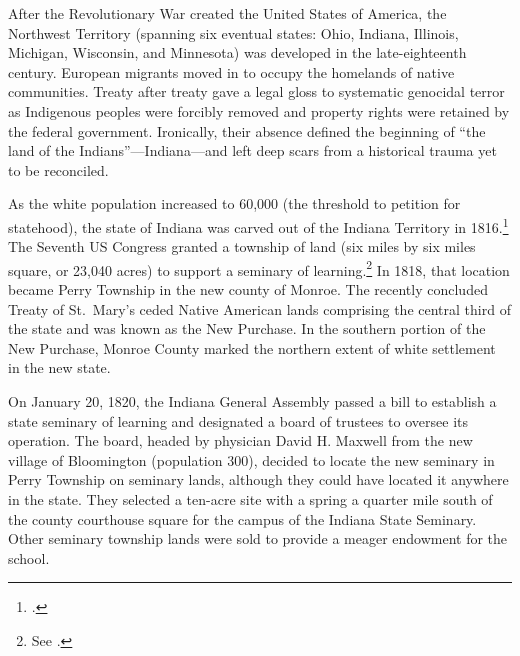 \documentclass[
  american,
  letterpaper,
]{scrreprt}
\begin{document}
After the Revolutionary War created the United States of America, the
Northwest Territory (spanning six eventual states: Ohio, Indiana,
Illinois, Michigan, Wisconsin, and Minnesota) was developed in the
late-eighteenth century. European migrants moved in to occupy the
homelands of native communities. Treaty after treaty gave a legal gloss
to systematic genocidal terror as Indigenous peoples were forcibly
removed and property rights were retained by the federal government.
Ironically, their absence defined the beginning of ``the land of the
Indians''---Indiana---and left deep scars from a historical trauma yet
to be reconciled.

As the white population increased to 60,000 (the threshold to petition
for statehood), the state of Indiana was carved out of the Indiana
Territory in 1816.\footnote{.} The Seventh US Congress granted a township of land (six miles by
six miles square, or 23,040 acres) to support a seminary of
learning.\footnote{See .} In 1818, that
location became Perry Township in the new county of Monroe. The recently
concluded Treaty of St.~Mary's ceded Native American lands comprising
the central third of the state and was known as the New Purchase. In the
southern portion of the New Purchase, Monroe County marked the northern
extent of white settlement in the new state.

On January 20, 1820, the Indiana General Assembly passed a bill to
establish a state seminary of learning and designated a board of
trustees to oversee its operation. The board, headed by physician David
H. Maxwell from the new village of Bloomington (population 300), decided
to locate the new seminary in Perry Township on seminary lands, although
they could have located it anywhere in the state. They selected a
ten-acre site with a spring a quarter mile south of the county
courthouse square for the campus of the Indiana State Seminary. Other
seminary township lands were sold to provide a meager endowment for the
school.
\end{document}
